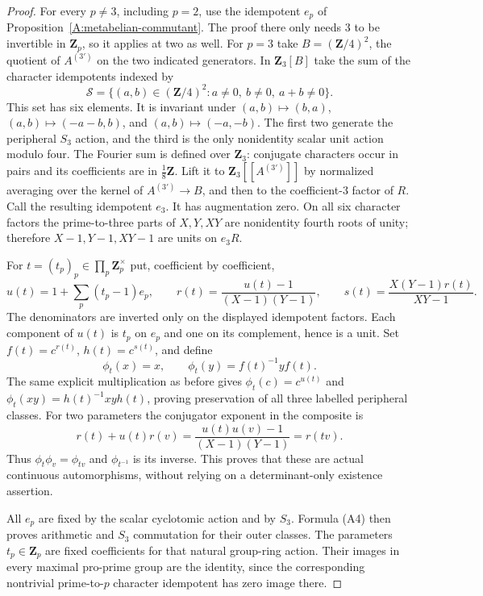 \begin{proof}
For every $p\ne3$, including $p=2$, use the idempotent
$e_p$ of Proposition~\ref{A:metabelian-commutant}.
The proof there only needs $3$ to be invertible in
$\mathbf Z_p$, so it applies at two as well. For $p=3$
take $B=(\mathbf Z/4)^2$, the quotient of $A^{(3')}$
on the two indicated generators. In $\mathbf Z_3[B]$
take the sum of the character idempotents indexed by
\[
 \mathcal S=\{(a,b)\in(\mathbf Z/4)^2:
                     a\ne0,\ b\ne0,\ a+b\ne0\}.
\]
This set has six elements. It is invariant under
$(a,b)\mapsto(b,a)$, $(a,b)\mapsto(-a-b,b)$, and
$(a,b)\mapsto(-a,-b)$. The first two generate the
peripheral $S_3$ action, and the third is the only
nonidentity scalar unit action modulo four. The Fourier
sum is defined over $\mathbf Z_3$: conjugate characters
occur in pairs and its coefficients are in
$\frac18\mathbf Z$. Lift it to
$\mathbf Z_3[[A^{(3')}]]$ by normalized averaging over
the kernel of $A^{(3')}\to B$, and then to the
coefficient-$3$ factor of $R$. Call the resulting
idempotent $e_3$. It has augmentation zero. On all
six character factors the prime-to-three parts of
$X,Y,XY$ are nonidentity fourth roots of unity;
therefore $X-1,Y-1,XY-1$ are units on $e_3R$.

For $t=(t_p)_p\in\prod_p\mathbf Z_p^\times$ put,
coefficient by coefficient,
\[
 u(t)=1+\sum_p(t_p-1)e_p,\qquad
 r(t)=\frac{u(t)-1}{(X-1)(Y-1)},\qquad
 s(t)=\frac{X(Y-1)r(t)}{XY-1}.
\]
The denominators are inverted only on the displayed
idempotent factors. Each component of $u(t)$ is $t_p$
on $e_p$ and one on its complement, hence is a unit.
Set $f(t)=c^{r(t)}$, $h(t)=c^{s(t)}$, and define
\[
 \phi_t(x)=x,\qquad \phi_t(y)=f(t)^{-1}yf(t).
\]
The same explicit multiplication as before gives
$\phi_t(c)=c^{u(t)}$ and
$\phi_t(xy)=h(t)^{-1}xyh(t)$, proving preservation
of all three labelled peripheral classes. For two
parameters the conjugator exponent in the composite is
\[
 r(t)+u(t)r(v)=\frac{u(t)u(v)-1}{(X-1)(Y-1)}=r(tv).
\]
Thus $\phi_t\phi_v=\phi_{tv}$ and
$\phi_{t^{-1}}$ is its inverse. This proves that these
are actual continuous automorphisms, without relying
on a determinant-only existence assertion.

All $e_p$ are fixed by the scalar cyclotomic action and
by $S_3$. Formula (A4) then proves arithmetic and
$S_3$ commutation for their outer classes. The
parameters $t_p\in\mathbf Z_p$ are fixed coefficients
for that natural group-ring action. Their images in
every maximal pro-prime group are the identity, since
the corresponding nontrivial prime-to-$p$ character
idempotent has zero image there.


\end{proof}
